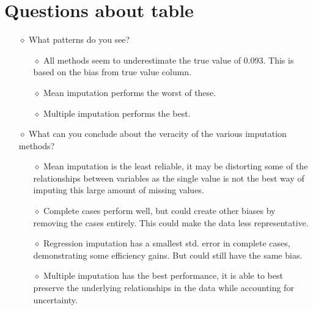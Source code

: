 \documentclass[12pt,letterpaper]{article}
\begin{document}
\section{Questions about table}
\begin{itemize}
    \item[$\diamond$] What patterns do you see?
        \begin{itemize}
            \item[$\diamond$] All methods seem to underestimate the true value of 0.093. This is based on the bias from true value column. 
         \end{itemize}
         \begin{itemize}
            \item[$\diamond$] Mean imputation performs the worst of these.
         \end{itemize}
         \begin{itemize}
            \item[$\diamond$] Multiple imputation performs the best. 
         \end{itemize}
\end{itemize}
\begin{itemize}
    \item[$\diamond$] What can you conclude about the veracity of the various imputation methods?
        \begin{itemize}
            \item[$\diamond$] Mean imputation is the least reliable, it may be distorting some of the relationships between variables as the single value is not the best way of imputing this large amount of missing values. 
         \end{itemize}
         \begin{itemize}
            \item[$\diamond$] Complete cases perform well, but could create other biases by removing the cases entirely. This could make the data less representative. 
         \end{itemize}
         \begin{itemize}
            \item[$\diamond$] Regression imputation has a smallest std. error in complete cases, demonstrating some efficiency gains. But could still have the same bias. 
         \end{itemize}
         \begin{itemize}
            \item[$\diamond$] Multiple imputation has the best performance, it is able to best preserve the underlying relationships in the data while accounting for uncertainty. 
         \end{itemize}
\end{itemize}
\end{document}
